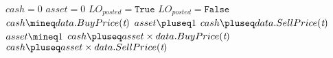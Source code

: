 \begin{algorithmic}[1]
\State $cash = 0$
\State $asset = 0$
		\State $LO_{posted} = \texttt{True}$
	\Else
		\State $LO_{posted} = \texttt{False}$
	\EndIf
				\State $cash \mineq data.BuyPrice(\textit{t})$	
				\State $asset \pluseq 1$
				\State $cash \pluseq data.SellPrice(\textit{t})$
				\State $asset \mineq 1$
			\EndIf
		\EndFor
	\EndIf
\EndFor
{} 
\State $cash \pluseq asset \times data.BuyPrice(\textit{t})$
\State $cash \pluseq asset \times data.SellPrice(\textit{t})$	
\EndIf
\end{algorithmic}
